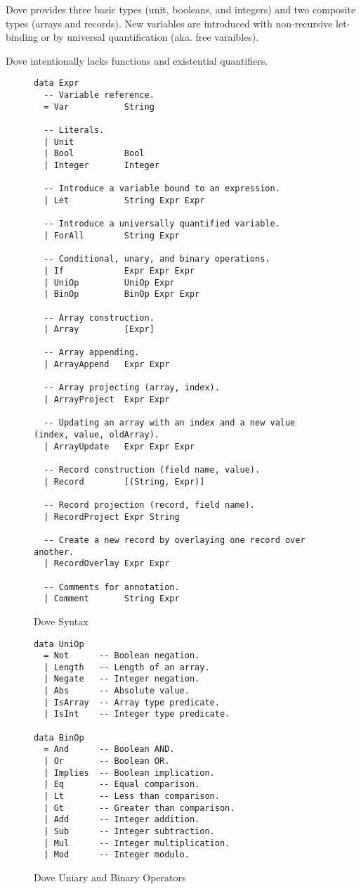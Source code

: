 \documentclass{article}
\begin{document}
Dove provides three basic types (unit, booleans, and integers)
and two composite types (arrays and records).
New variables are introduced with non-recursive let-binding
or by universal quantification (aka. free varaibles).

Dove intentionally lacks functions and existential quantifiers.

\begin{figure}
  \caption{Dove Syntax}
  \label{doveSyntax}
  \begin{lstlisting}
data Expr
  -- Variable reference.
  = Var           String

  -- Literals.
  | Unit
  | Bool          Bool
  | Integer       Integer

  -- Introduce a variable bound to an expression.
  | Let           String Expr Expr

  -- Introduce a universally quantified variable.
  | ForAll        String Expr

  -- Conditional, unary, and binary operations.
  | If            Expr Expr Expr
  | UniOp         UniOp Expr
  | BinOp         BinOp Expr Expr

  -- Array construction.
  | Array         [Expr]

  -- Array appending.
  | ArrayAppend   Expr Expr

  -- Array projecting (array, index).
  | ArrayProject  Expr Expr

  -- Updating an array with an index and a new value (index, value, oldArray).
  | ArrayUpdate   Expr Expr Expr

  -- Record construction (field name, value).
  | Record        [(String, Expr)]

  -- Record projection (record, field name).
  | RecordProject Expr String

  -- Create a new record by overlaying one record over another.
  | RecordOverlay Expr Expr

  -- Comments for annotation.
  | Comment       String Expr
  \end{lstlisting}
\end{figure}

\begin{figure}
  \caption{Dove Uniary and Binary Operators}
  \label{doveOperators}
  \begin{lstlisting}
data UniOp
  = Not      -- Boolean negation.
  | Length   -- Length of an array.
  | Negate   -- Integer negation.
  | Abs      -- Absolute value.
  | IsArray  -- Array type predicate.
  | IsInt    -- Integer type predicate.

data BinOp
  = And      -- Boolean AND.
  | Or       -- Boolean OR.
  | Implies  -- Boolean implication.
  | Eq       -- Equal comparison.
  | Lt       -- Less than comparison.
  | Gt       -- Greater than comparison.
  | Add      -- Integer addition.
  | Sub      -- Integer subtraction.
  | Mul      -- Integer multiplication.
  | Mod      -- Integer modulo.
  \end{lstlisting}
\end{figure}
\end{document}
